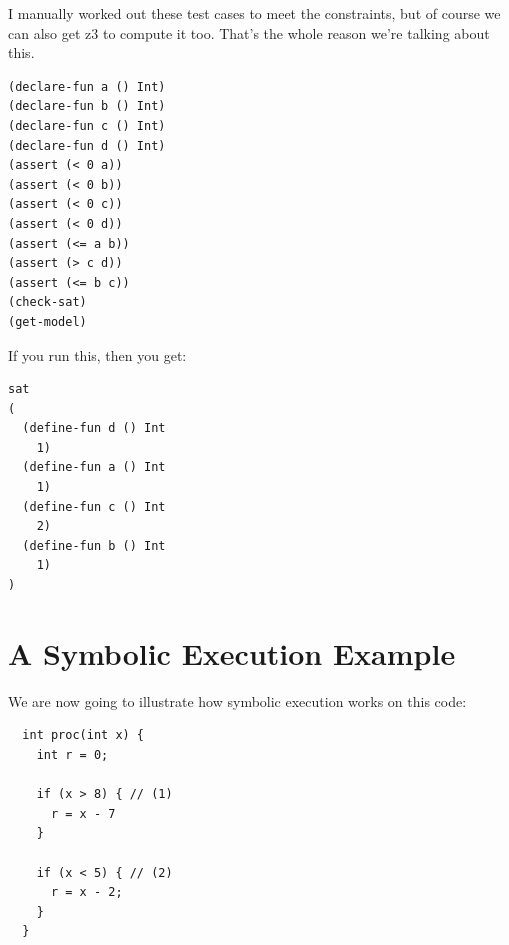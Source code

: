 \documentclass[11pt]{article}
\begin{document}
\begin{center}
\end{center}

I manually worked out these test cases to meet the constraints, but of course we can also get z3 to compute it too.
That's the whole reason we're talking about this.

\begin{lstlisting}
(declare-fun a () Int)
(declare-fun b () Int)
(declare-fun c () Int)
(declare-fun d () Int)
(assert (< 0 a))
(assert (< 0 b))
(assert (< 0 c))
(assert (< 0 d))
(assert (<= a b)) 
(assert (> c d))
(assert (<= b c))
(check-sat)
(get-model)
\end{lstlisting}

If you run this, then you get:
\begin{lstlisting}
sat
(
  (define-fun d () Int
    1)
  (define-fun a () Int
    1)
  (define-fun c () Int
    2)
  (define-fun b () Int
    1)
)
\end{lstlisting}

\section*{A Symbolic Execution Example}
We are now going to illustrate how symbolic execution works on this code:
\begin{lstlisting}
  int proc(int x) {
    int r = 0;

    if (x > 8) { // (1)
      r = x - 7
    }

    if (x < 5) { // (2)
      r = x - 2;
    }
  }

\end{lstlisting}
\end{document}
